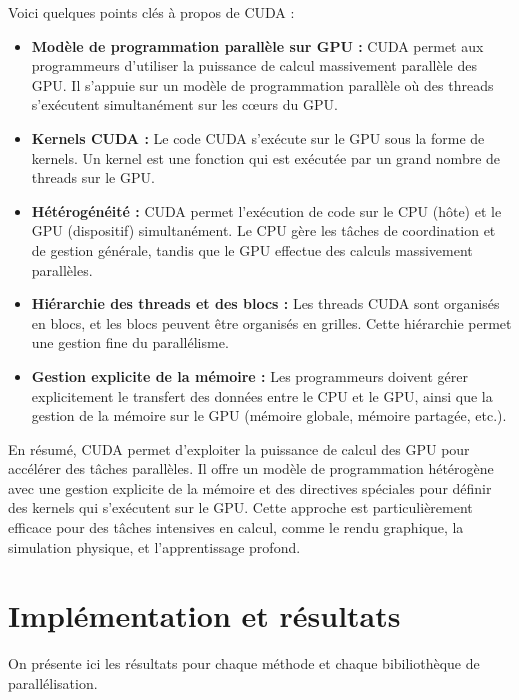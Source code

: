 \documentclass[10pt,a4paper]{article}
\begin{document}
Voici quelques points clés à propos de CUDA :

\begin{itemize}
    
    \item \textbf{Modèle de programmation parallèle sur GPU :} CUDA permet aux programmeurs d'utiliser la puissance de calcul massivement parallèle des GPU. Il s'appuie sur un modèle de programmation parallèle où des threads s'exécutent simultanément sur les cœurs du GPU.
    
    \item \textbf{Kernels CUDA :} Le code CUDA s'exécute sur le GPU sous la forme de kernels. Un kernel est une fonction qui est exécutée par un grand nombre de threads sur le GPU.
    
    \item \textbf{Hétérogénéité :} CUDA permet l'exécution de code sur le CPU (hôte) et le GPU (dispositif) simultanément. Le CPU gère les tâches de coordination et de gestion générale, tandis que le GPU effectue des calculs massivement parallèles.
    
    \item \textbf{Hiérarchie des threads et des blocs :} Les threads CUDA sont organisés en blocs, et les blocs peuvent être organisés en grilles. Cette hiérarchie permet une gestion fine du parallélisme.
    
    \item \textbf{Gestion explicite de la mémoire :} Les programmeurs doivent gérer explicitement le transfert des données entre le CPU et le GPU, ainsi que la gestion de la mémoire sur le GPU (mémoire globale, mémoire partagée, etc.).
\end{itemize}


En résumé, CUDA permet d'exploiter la puissance de calcul des GPU pour accélérer des tâches parallèles. Il offre un modèle de programmation hétérogène avec une gestion explicite de la mémoire et des directives spéciales pour définir des kernels qui s'exécutent sur le GPU. Cette approche est particulièrement efficace pour des tâches intensives en calcul, comme le rendu graphique, la simulation physique, et l'apprentissage profond.

\clearpage
\section{Implémentation et résultats}
On présente ici les résultats pour chaque méthode et chaque bibiliothèque de parallélisation.
\end{document}

